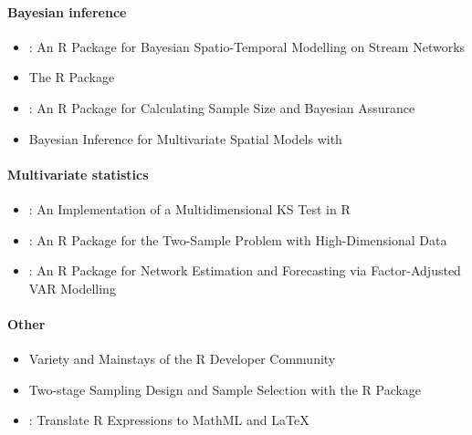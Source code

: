 \hypertarget{bayesian-inference}{%
\paragraph{Bayesian inference}\label{bayesian-inference}}

\begin{itemize}
\tightlist
\item
  : An R Package for Bayesian Spatio-Temporal Modelling on Stream Networks
\item
  The R Package 
\item
  : An R Package for Calculating Sample Size and Bayesian Assurance
\item
  Bayesian Inference for Multivariate Spatial Models with 
\end{itemize}

\hypertarget{multivariate-statistics}{%
\paragraph{Multivariate statistics}\label{multivariate-statistics}}

\begin{itemize}
\tightlist
\item
  : An Implementation of a Multidimensional KS Test in R
\item
  : An R Package for the Two-Sample Problem with High-Dimensional Data
\item
  : An R Package for Network Estimation and Forecasting via Factor-Adjusted VAR Modelling
\end{itemize}

\hypertarget{other}{%
\paragraph{Other}\label{other}}

\begin{itemize}
\tightlist
\item
  Variety and Mainstays of the R Developer Community
\item
  Two-stage Sampling Design and Sample Selection with the R Package 
\item
  : Translate R Expressions to MathML and LaTeX
\end{itemize}

\clearpage


\address{%
Simon Urbanek\\
University of Auckland\\%
\\
%
\url{https://journal.r-project.org}\\%
%
\href{mailto:r-journal@r-project.org}{\nolinkurl{r-journal@r-project.org}}%
}
